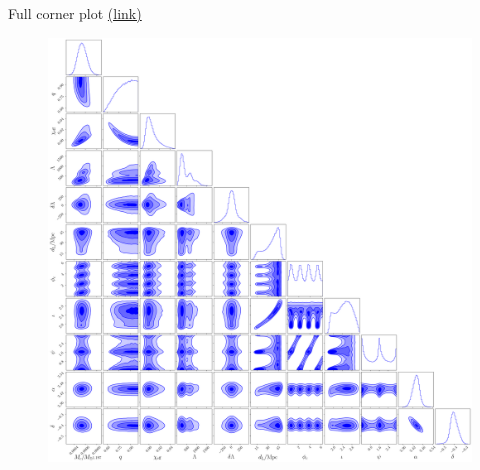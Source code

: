 \documentclass[usenames,dvipsnames,t]{beamer}
\begin{document}
\begin{frame}{Full corner plot \href{https://ldas-jobs.ligo.caltech.edu/~thibeau.wouters/jim_runs/GW170817_TaylorF2/outdir/postprocessing_production_reweighted.png}{(link)}}

  \begin{figure}
    \centering
    \includegraphics[scale=0.125]{Figures/full_corner.png}
  \end{figure}  
\end{frame}
\end{document}
